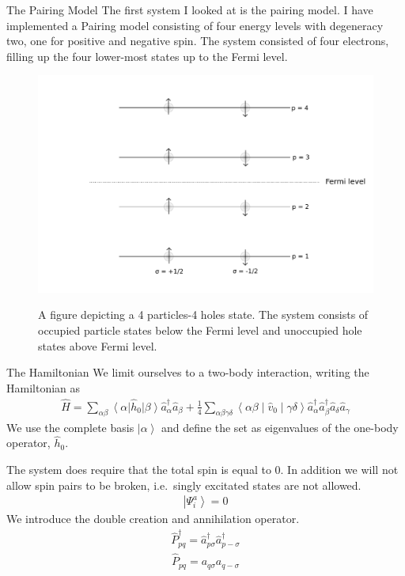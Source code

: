 \documentclass[twoside,english]{uiofysmaster}
\begin{document}
\begin{chapter}{The Pairing Model}
	The first system I looked at is the pairing model. I have implemented a Pairing model consisting of four energy levels with degeneracy two, one for positive and negative spin. The system consisted of four electrons, filling up the four lower-most states up to the Fermi level. 
	\begin{figure}[h]
		\includegraphics[width=\textwidth]{Figures/Pairing_model.pdf}
		\label{PairingModel_1}
		\caption{A figure depicting a 4 particles-4 holes state. The system consists of occupied particle states below the Fermi level and unoccupied hole states above Fermi level.}
	\end{figure}
	
	\begin{section}{The Hamiltonian}
		We limit ourselves to a two-body interaction, writing the Hamiltonian as
		\begin{align}
			\hat H = \sum_{\alpha \beta} \left< \alpha \right| \hat h_0 \left| \beta \right> \hat a_{\alpha}^{\dagger} \hat a_{\beta} 
			        + \frac{1}{4} \sum_{\alpha \beta \gamma \delta} \left< \alpha \beta \middle| \hat v_0 \middle| \gamma \delta \right> \hat a_{\alpha}^{\dagger} \hat a_{\beta}^{\dagger} \hat a_{\delta} \hat a_{\gamma}
		\end{align}
		We use the complete basis $\left| \alpha \right>$ and define the set as eigenvalues of the one-body operator, $\hat h_0$. 
		
		The system does require that the total spin is equal to $0$. In addition we will not allow spin pairs to be broken, i.e.\  singly excitated states are not allowed. 
		\begin{align}
			\left| \Psi_i^a \right> = 0 
		\end{align}	
		We introduce the double creation and annihilation operator. 
		\begin{align}
			\hat P_{pq}^{\dagger} = \hat a_{p \sigma}^{\dagger} \hat a_{p -\sigma}^{\dagger}
		\end{align}
		\begin{align}
			\hat P_{pq} =  a_{q \sigma} a_{q -\sigma}
		\end{align}


\end{section}
\end{chapter}
\end{document}
